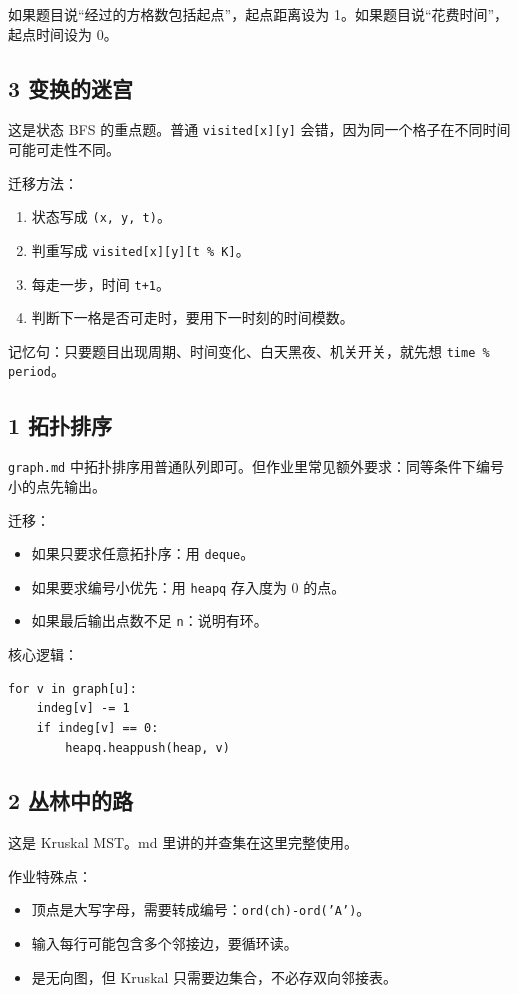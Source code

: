 \documentclass[10pt,a4paper,fontset=none]{ctexart}
\begin{document}
如果题目说“经过的方格数包括起点”，起点距离设为 1。如果题目说“花费时间”，起点时间设为 0。

\subsection{3 变换的迷宫}
这是状态 BFS 的重点题。普通 \texttt{visited[x][y]} 会错，因为同一个格子在不同时间可能可走性不同。

迁移方法：
\begin{enumerate}
  \item 状态写成 \texttt{(x, y, t)}。
  \item 判重写成 \texttt{visited[x][y][t \% K]}。
  \item 每走一步，时间 \texttt{t+1}。
  \item 判断下一格是否可走时，要用下一时刻的时间模数。
\end{enumerate}

记忆句：只要题目出现周期、时间变化、白天黑夜、机关开关，就先想 \texttt{time \% period}。

\subsection{1 拓扑排序}
\texttt{graph.md} 中拓扑排序用普通队列即可。但作业里常见额外要求：同等条件下编号小的点先输出。

迁移：
\begin{itemize}
  \item 如果只要求任意拓扑序：用 \texttt{deque}。
  \item 如果要求编号小优先：用 \texttt{heapq} 存入度为 0 的点。
  \item 如果最后输出点数不足 \texttt{n}：说明有环。
\end{itemize}

核心逻辑：
\begin{lstlisting}[style=py]
for v in graph[u]:
    indeg[v] -= 1
    if indeg[v] == 0:
        heapq.heappush(heap, v)
\end{lstlisting}

\subsection{2 丛林中的路}
这是 Kruskal MST。md 里讲的并查集在这里完整使用。

作业特殊点：
\begin{itemize}
  \item 顶点是大写字母，需要转成编号：\texttt{ord(ch)-ord('A')}。
  \item 输入每行可能包含多个邻接边，要循环读。
  \item 是无向图，但 Kruskal 只需要边集合，不必存双向邻接表。
\end{itemize}
\end{document}

